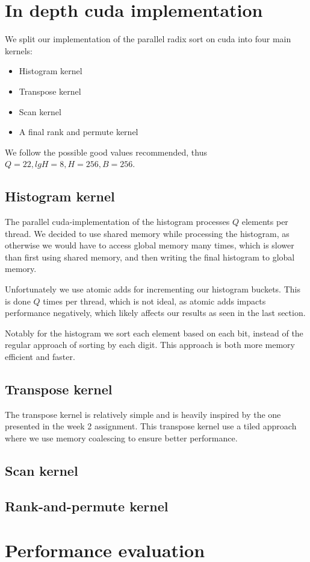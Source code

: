 \documentclass{article}
\begin{document}
\section{In depth cuda implementation}
We split our implementation of the parallel radix sort on cuda into four main kernels:
\begin{itemize}
    \item Histogram kernel
    \item Transpose kernel
    \item Scan kernel
    \item A final rank and permute kernel
\end{itemize}

We follow the possible good values recommended, thus $Q = 22, lgH = 8, H = 256, B = 256$.

\subsection{Histogram kernel}
The parallel cuda-implementation of the histogram processes $Q$ elements per thread. We decided to use shared memory while processing the histogram, as otherwise we would have to access global memory many times, which is slower than first using shared memory, and then writing the final histogram to global memory.

Unfortunately we use atomic adds for incrementing our histogram buckets. This is done $Q$ times per thread, which is not ideal, as atomic adds impacts performance negatively, which likely affects our results as seen in the last section.

Notably for the histogram we sort each element based on each bit, instead of the regular approach of sorting by each digit. This approach is both more memory efficient and faster.  

\subsection{Transpose kernel}

The transpose kernel is relatively simple and is heavily inspired by the one presented in the week 2 assignment. This transpose kernel use a tiled approach where we use memory coalescing to ensure better performance.
\subsection{Scan kernel}

\subsection{Rank-and-permute kernel}

\section{Performance evaluation}



\end{document}
